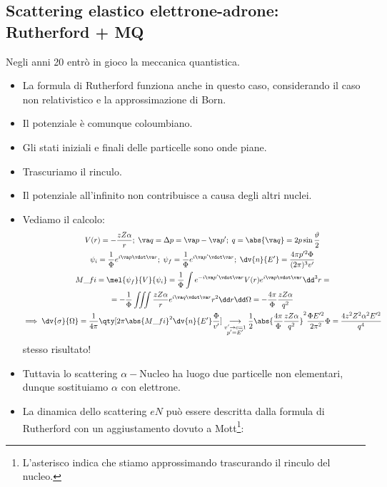 \subsection{Scattering elastico elettrone-adrone: Rutherford + MQ}
Negli anni 20 entrò in gioco la meccanica quantistica. 
\begin{itemize}
    \item La formula di Rutherford funziona anche in questo caso, considerando il caso non relativistico e la approssimazione di Born.
    \item Il potenziale è comunque coloumbiano.
    \item Gli stati iniziali e finali delle particelle sono onde piane.
    \item Trascuriamo il rinculo.
    \item Il potenziale all'infinito non contribuisce a causa degli altri nuclei.
    \item Vediamo il calcolo:
    \begin{gather*}
        V(r)=-\frac{zZ\alpha}r;\;\va q=\Delta p=\va p-\va p';\;q=\abs{\va q}=2p\sin\frac\vartheta2\\
        \psi_i=\frac1\Phi e^{i\va p\vdot \va r};\;\psi_f=\frac1\Phi e^{i\va p'\vdot \va r};\; \dv{n}{E'}=\frac{4\pi p'^2\Phi}{(2\pi)^3v'}\\
        M\_{fi}=\mel{\psi_f}{V}{\psi_i}=\frac1\Phi\int e^{-i\va p'\vdot\va r}V(r)e^{i\va p\vdot\va r}\dd^3r=\\
        =-\frac1\Phi\iiint \frac{zZ\alpha}re^{i\va q\vdot\va r}r^2\dd r\dd\Omega=-\frac{4\pi}\Phi\frac{zZ\alpha}{q^2}\\
        \implies \dv{\sigma}{\Omega}=\frac1{4\pi}\qty[2\pi\abs{M\_{fi}}^2\dv{n}{E'}\frac\Phi{v'}]\underset{\begin{subarray}{c}
            v'\to c=1\\
            p'=E'
         \end{subarray}}{\longrightarrow}\frac12\abs{\frac{4\pi}\Phi\frac{zZ\alpha}{q^2}}^2\frac{\Phi E'^2}{2\pi^2}\Phi=\frac{4z^2Z^2\alpha^2E'^2}{q^4}
    \end{gather*}
    stesso risultato!
    \item Tuttavia lo scattering $\alpha-$Nucleo ha luogo due particelle non elementari, dunque sostituiamo $\alpha$ con elettrone. 
    \item La dinamica dello scattering $eN$ può essere descritta dalla formula di Rutherford con un aggiustamento dovuto a Mott\footnote{L'asterisco indica che stiamo approssimando trascurando il rinculo del nucleo.}:

\end{itemize}
